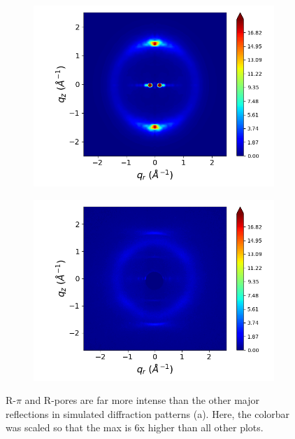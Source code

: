 \documentclass[journal=jpcbfk,manusciprt=article]{achemso}
\begin{document}
  \begin{figure}
  \centering
  \begin{subfigure}{0.4\textwidth}
	  \includegraphics[width=\linewidth]{sandwich_rzplot_highlimit_cbar.png}
	  \caption{}\label{fig:simulated_adjusted_colorbar}
  \end{subfigure}
  \begin{subfigure}{0.4\textwidth}
	  \includegraphics[width=\linewidth]{WAXS_raw_adjusted_colorbar.png}
	  \caption{}\label{fig:experimental_adjusted_colorbar}
  \end{subfigure}
  \caption{R-$\pi$ and R-pores are far more intense than the other major reflections in 
  simulated diffraction patterns (a). Here, the colorbar was scaled so that the max is 6x
  higher than all other plots.}\label{fig:intense_rpi}
  \end{figure}
\end{document}
